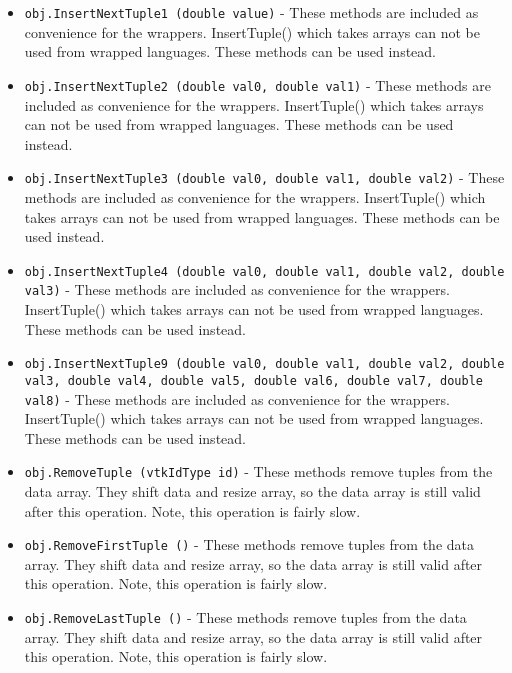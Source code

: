 \begin{itemize}
\item  \verb|obj.InsertNextTuple1 (double value)| -  These methods are included as convenience for the wrappers.
 InsertTuple() which takes arrays can not be 
 used from wrapped languages. These methods can be used instead.

\item  \verb|obj.InsertNextTuple2 (double val0, double val1)| -  These methods are included as convenience for the wrappers.
 InsertTuple() which takes arrays can not be 
 used from wrapped languages. These methods can be used instead.

\item  \verb|obj.InsertNextTuple3 (double val0, double val1, double val2)| -  These methods are included as convenience for the wrappers.
 InsertTuple() which takes arrays can not be 
 used from wrapped languages. These methods can be used instead.

\item  \verb|obj.InsertNextTuple4 (double val0, double val1, double val2, double val3)| -  These methods are included as convenience for the wrappers.
 InsertTuple() which takes arrays can not be 
 used from wrapped languages. These methods can be used instead.

\item  \verb|obj.InsertNextTuple9 (double val0, double val1, double val2, double val3, double val4, double val5, double val6, double val7, double val8)| -  These methods are included as convenience for the wrappers.
 InsertTuple() which takes arrays can not be 
 used from wrapped languages. These methods can be used instead.

\item  \verb|obj.RemoveTuple (vtkIdType id)| -  These methods remove tuples from the data array. They shift data and
 resize array, so the data array is still valid after this operation. Note,
 this operation is fairly slow.

\item  \verb|obj.RemoveFirstTuple ()| -  These methods remove tuples from the data array. They shift data and
 resize array, so the data array is still valid after this operation. Note,
 this operation is fairly slow.

\item  \verb|obj.RemoveLastTuple ()| -  These methods remove tuples from the data array. They shift data and
 resize array, so the data array is still valid after this operation. Note,
 this operation is fairly slow.


\end{itemize}

